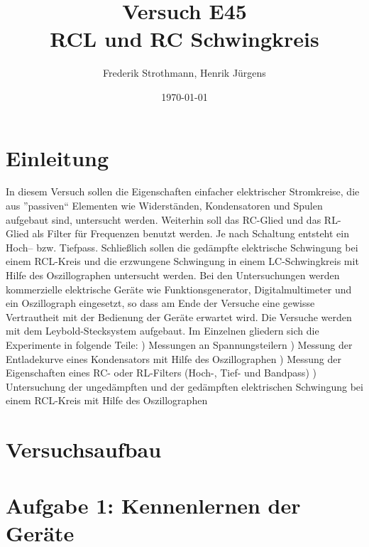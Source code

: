 \documentclass[12pt]{scrartcl}
\title{Versuch E45\\ RCL und RC Schwingkreis}
\author{Frederik Strothmann, Henrik Jürgens}
\date{\today}
\begin{document}

\maketitle
\newpage
\tableofcontents
\newpage


\section{Einleitung}

In diesem Versuch sollen die Eigenschaften einfacher elektrischer Stromkreise, die aus ”passiven“ Elementen wie
Widerständen, Kondensatoren und Spulen aufgebaut sind, untersucht werden. Weiterhin soll das RC-Glied und das
RL-Glied als Filter für Frequenzen benutzt werden. Je nach Schaltung entsteht ein Hoch– bzw. Tiefpass. Schließlich sollen die gedämpfte elektrische Schwingung bei einem RCL-Kreis und die erzwungene Schwingung
in einem LC-Schwingkreis mit Hilfe des Oszillographen untersucht werden. Bei den Untersuchungen werden kommerzielle elektrische Geräte wie Funktionsgenerator, Digitalmultimeter und ein Oszillograph eingesetzt, so dass am Ende der Versuche eine gewisse Vertrautheit mit der Bedienung der Geräte erwartet wird. Die Versuche werden mit dem Leybold-Stecksystem aufgebaut. Im Einzelnen gliedern sich die Experimente in folgende Teile:
)
Messungen an Spannungsteilern
)
Messung der Entladekurve eines Kondensators mit Hilfe des Oszillographen
)
Messung der Eigenschaften eines RC- oder RL-Filters (Hoch-, Tief- und Bandpass)
)
Untersuchung der ungedämpften und der gedämpften elektrischen Schwingung bei einem RCL-Kreis mit Hilfe des Oszillographen

\section{Versuchsaufbau}


\section{Aufgabe 1: Kennenlernen der Geräte}
\end{document}
